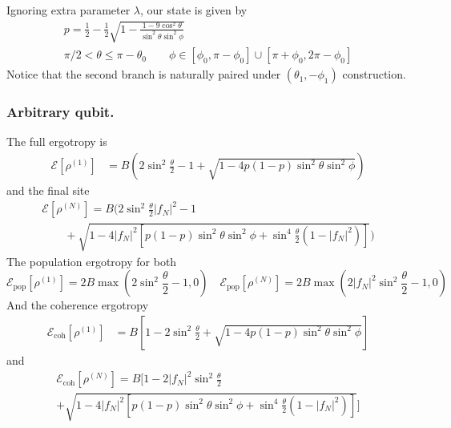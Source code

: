 \documentclass[../../../main.tex]{subfiles}
\begin{document}
Ignoring extra parameter $\lambda$, our state is given by
\begin{gather*}
  p = \frac{1 }{2 }- \frac{1 }{2} \sqrt{1 - \frac{1-9\cos^2\theta}{\sin^2\theta\sin^2\phi}}\\
  \pi/2<\theta\le \pi - \theta_0 \qquad
  \phi \in[\phi_0,\pi-\phi_0] \cup[\pi+\phi_0,2\pi-\phi_0]
\end{gather*}
Notice that the second branch is naturally paired under $(\theta_1,-\phi_1)$ construction.

\subsubsection{Arbitrary qubit.}
The full ergotropy is
\begin{align*}
  \mathcal{E} \left[ \rho^{(1)} \right]
   & = B \left( 2\sin^2 \frac{\theta }{2} - 1 + \sqrt{1 - 4p(1-p)\sin ^2\theta \sin^2 \phi}  \right)
\end{align*}
and the final site
\begin{multline*}
  \mathcal{E} \left[ \rho^{(N)} \right]     = B \bigg( 2\sin^2 \frac{\theta }{2} |f_N|^2 - 1
  \\  \qquad+  \sqrt{1 - 4|f_N|^2 \left[ p(1-p)\sin ^2\theta \sin^2 \phi + \sin ^4 \frac{\theta }{2 }(1-|f_N|^2) \right]}  \bigg)
\end{multline*}
The population ergotropy for both
\begin{equation*}
  \mathcal{E}_\text{pop} \left[ \rho^{(1)} \right]= 2B\max(2 \sin^2 \frac{\theta }{2 }-1,0)  \quad
  \mathcal{E}_\text{pop} \left[ \rho^{(N)} \right]= 2B\max(2 |f_N|^2\sin ^2\frac{\theta}{2 }-1,0)
\end{equation*}
And the coherence ergotropy
\begin{align*}
  \mathcal{E}_\text{coh}\left[ \rho^{(1)}\right]
   & = B \left[  1 - 2 \sin ^2 \frac{\theta }{2} + \sqrt{1-4p(1-p)\sin ^2\theta \sin^2 \phi}  \right]
\end{align*}
and
\begin{multline*}
  \mathcal{E}_\text{coh}\left[ \rho^{(N)}\right]
  = B \bigg[  1 - 2 |f_N|^2\sin ^2 \frac{\theta }{2} \\
    + \sqrt{1-4 |f_N|^2 \left[ p(1-p)\sin ^2\theta \sin^2 \phi
        + \sin ^4 \frac{\theta }{2 }(1-|f_N|^2) \right] }  \bigg]
\end{multline*}
\end{document}
